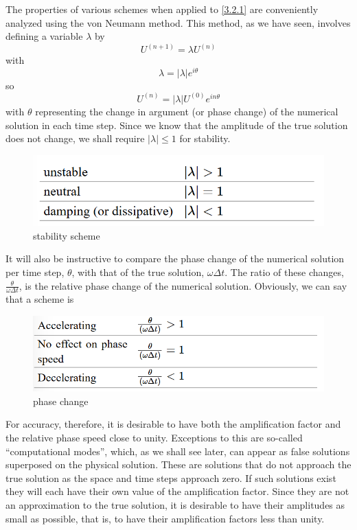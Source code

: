 The properties of various schemes when applied to \ref{3.2.1} are conveniently analyzed using the von Neumann method. This method, as we have seen, involves defining a variable $\lambda$ by
\begin{equation}\label{3.2.3}
    U^{(n+1)}=\lambda U^{(n)}
\end{equation}
with 
$$\lambda=|\lambda|e^{i\theta}$$
so 
\begin{equation}\label{3.2.5}
    U^{(n)}=|\lambda|U^{(0)}e^{in\theta}
\end{equation}
with $\theta$ representing the change in argument (or phase change) of the numerical solution in each time step. Since we know that the amplitude of the true solution does not change, we shall require $|\lambda|\leq 1$ for stability.
\begin{figure}[h]
    \centering
    \includegraphics[width=0.50\linewidth]{uploads/Screenshot 2024-11-11 225800.png}
    \caption{stability scheme}
    \label{fig:stab scheme}
\end{figure}
It will also be instructive to compare the phase change of the numerical solution per time step, $\theta$, with that of the true solution, $\omega\Delta t$. The ratio of these changes, $\frac{\theta}{\omega\Delta t}$, is the relative phase change of the numerical solution. Obviously, we can say that a scheme is
\begin{figure}[h]
    \centering
    \includegraphics[width=0.50\linewidth]{uploads/Screenshot 2024-11-11 230012.png}
    \caption{phase change}
    \label{fig:phase change}
\end{figure}
For accuracy, therefore, it is desirable to have both the amplification factor and the relative phase speed close to unity. Exceptions to this are so-called “computational modes”, which, as we shall see later, can appear as false solutions superposed on the physical solution. These are solutions that do not approach the true solution as the space and time steps approach zero. If such solutions exist they will each have their own value of the amplification factor. Since they are not an approximation to the true solution, it is desirable to have their amplitudes as small as possible, that is, to have their amplification factors less than unity.

